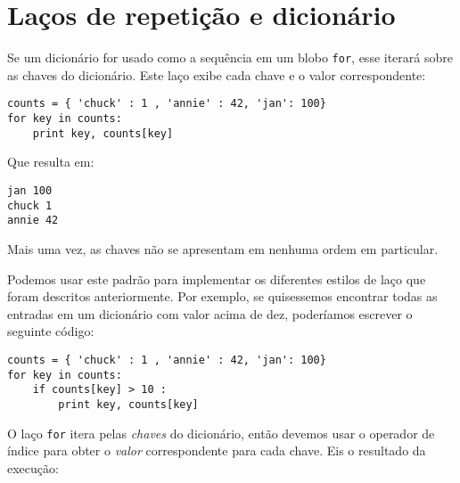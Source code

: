 \section{Laços de repetição e dicionário}


Se um dicionário for usado como a sequência em um blobo {\tt for}, esse iterará sobre as chaves do dicionário. Este laço exibe cada chave e o valor correspondente:

\beforeverb
\begin{verbatim}
counts = { 'chuck' : 1 , 'annie' : 42, 'jan': 100}
for key in counts:
    print key, counts[key]
\end{verbatim}
\afterverb
%
Que resulta em:

\beforeverb
\begin{verbatim}
jan 100
chuck 1
annie 42
\end{verbatim}
\afterverb
%
Mais uma vez, as chaves não se apresentam em nenhuma ordem em particular.

Podemos usar este padrão para implementar os diferentes estilos de laço que foram descritos anteriormente. Por exemplo, se quisessemos encontrar todas as entradas em um dicionário com valor acima de dez, poderíamos escrever o seguinte código:

\beforeverb
\begin{verbatim}
counts = { 'chuck' : 1 , 'annie' : 42, 'jan': 100}
for key in counts:
    if counts[key] > 10 :
        print key, counts[key]
\end{verbatim}
\afterverb
%
O laço {\tt for} itera pelas {\em chaves} do dicionário, então devemos usar o operador de índice para obter o {\em valor} correspondente para cada chave.
Eis o resultado da execução:

